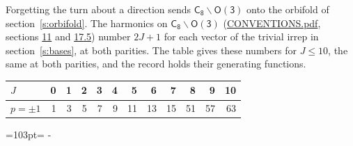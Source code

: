 \documentclass[10pt,a4paper]{article}
\newcommand{\needspace}[1]{\par\penalty-100\begingroup\dimen0=#1\relax\dimen2=\pagegoal
  \advance\dimen2-\pagetotal\ifdim\dimen0>\dimen2\relax\ifdim\dimen2>0pt\vfil\break\fi\fi
  \endgroup}
\numberwithin{equation}{section}
\newcommand{\grp}[1]{\mathsf{#1}}
\begin{document}
Forgetting the turn about a direction sends $\grp{C_{8}}\backslash\grp{O(3)}$ onto the orbifold of section~\ref{s:orbifold}.
The harmonics on $\grp{C_{8}}\backslash\grp{O(3)}$ (\href{../../CONVENTIONS.pdf}{CONVENTIONS.pdf}, sections \href{../../CONVENTIONS.pdf\#conv.11}{11} and \href{../../CONVENTIONS.pdf\#conv.17.5}{17.5}) number $2J + 1$ for each vector of the trivial irrep in section~\ref{s:bases}, at both parities. The table gives these numbers for $J \le 10$, the same at both parities, and the record holds their generating functions.
{\small\setlength{\tabcolsep}{4pt}\begin{longtable}{@{}lrrrrrrrrrrr@{}}\toprule
$J$ & 0 & 1 & 2 & 3 & 4 & 5 & 6 & 7 & 8 & 9 & 10\\\midrule\endhead
\bottomrule\endfoot\endlastfoot
$p = \pm 1$ & 1 & 3 & 5 & 7 & 9 & 11 & 13 & 15 & 51 & 57 & 63\\
\bottomrule\end{longtable}}
\needspace{103pt}
\end{document}
